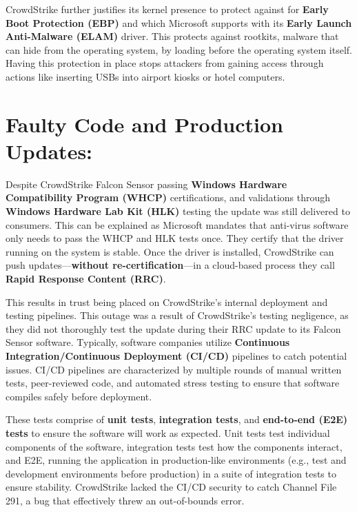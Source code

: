 CrowdStrike further justifies its kernel presence to protect against for \textbf{Early Boot Protection (EBP)} and which Microsoft supports with its \textbf{Early Launch Anti-Malware (ELAM)} driver. \cite{ionescu_kernel_access_2024} This protects against rootkits, malware that can hide from the operating system, by loading before the operating system itself. Having this protection in place stops attackers from gaining access through actions like inserting USBs into airport kiosks or hotel computers. \cite{baker_rootkits_2023}

\section{Faulty Code and Production Updates:}

Despite CrowdStrike Falcon Sensor passing \textbf{Windows Hardware Compatibility Program (WHCP)} certifications, and 
validations through \textbf{Windows Hardware Lab Kit (HLK)} testing the update was still delivered to consumers. \cite{microsoftwhcpcertification}
This can be explained as Microsoft mandates that anti-virus software only needs to pass the WHCP and HLK tests once. They certify that the driver running on the system is stable. Once the driver is installed, CrowdStrike can push updates---\textbf{without re-certification}---in a cloud-based process they call \textbf{Rapid Response Content (RRC)}. \cite{crowdstrikechannelfile291rca}

This results in trust being placed on CrowdStrike's internal deployment and testing pipelines. This outage was a result of CrowdStrike's testing negligence, as they did not thoroughly test the update during their RRC update to its Falcon Sensor software. Typically, software companies utilize \textbf{Continuous Integration/Continuous Deployment (CI/CD)} pipelines to catch potential issues. CI/CD pipelines are characterized by multiple rounds of manual written tests, peer-reviewed code, and automated stress testing to ensure that software compiles safely before deployment. \cite{redhat_cicd_2023}

These tests comprise of \textbf{unit tests}, \textbf{integration tests}, and \textbf{end-to-end (E2E) tests} to ensure the software will work as expected. Unit tests test individual components of the software, integration tests test how the components interact, and E2E, running the application in production-like environments (e.g., test and development environments before production) in 
a suite of integration tests to ensure stability. CrowdStrike lacked the CI/CD security to catch Channel File 291, a bug that effectively threw an out-of-bounds error.

